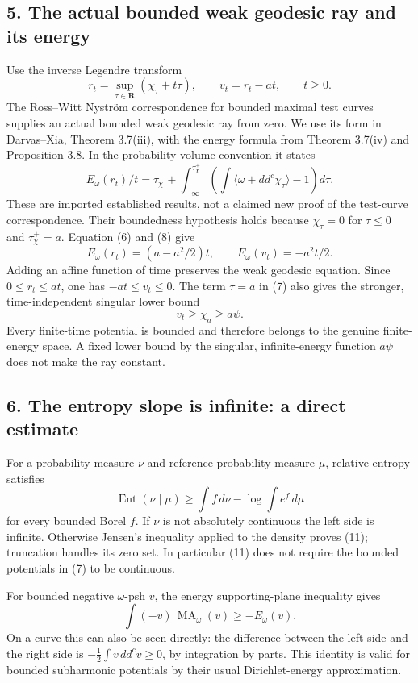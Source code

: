 \documentclass[
]{article}
\begin{document}
\subsection{5. The actual bounded weak geodesic ray and its
energy}\label{the-actual-bounded-weak-geodesic-ray-and-its-energy}

Use the inverse Legendre transform \[
 r_t=\sup_{\tau\in\mathbf R}(\chi_\tau+t\tau),\qquad
 v_t=r_t-at,\qquad t\geq0.
 \tag{7}
\] The Ross--Witt Nyström correspondence for bounded maximal test curves
supplies an actual bounded weak geodesic ray from zero. We use its form
in Darvas--Xia, Theorem 3.7(iii), with the energy formula from Theorem
3.7(iv) and Proposition 3.8. In the probability-volume convention it
states \[
 E_\omega(r_t)/t=\tau^+_\chi+
 \int_{-\infty}^{\tau^+_\chi}
 \left(\int\langle\omega+dd^c\chi_\tau\rangle-1\right)d\tau.
 \tag{8}
\] These are imported established results, not a claimed new proof of
the test-curve correspondence. Their boundedness hypothesis holds
because \(\chi_\tau=0\) for \(\tau\leq0\) and \(\tau^+_\chi=a\).
Equation (6) and (8) give \[
 E_\omega(r_t)=(a-a^2/2)t,\qquad E_\omega(v_t)=-a^2t/2.
 \tag{9}
\] Adding an affine function of time preserves the weak geodesic
equation. Since \(0\leq r_t\leq at\), one has \(-at\leq v_t\leq0\). The
term \(\tau=a\) in (7) also gives the stronger, time-independent
singular lower bound \[
 v_t\geq\chi_a\geq a\psi.
 \tag{10}
\] Every finite-time potential is bounded and therefore belongs to the
genuine finite-energy space. A fixed lower bound by the singular,
infinite-energy function \(a\psi\) does not make the ray constant.

\subsection{6. The entropy slope is infinite: a direct
estimate}\label{the-entropy-slope-is-infinite-a-direct-estimate}

For a probability measure \(\nu\) and reference probability measure
\(\mu\), relative entropy satisfies \[
 \operatorname{Ent}(\nu\mid\mu)\geq\int f\,d\nu-\log\int e^f\,d\mu
 \tag{11}
\] for every bounded Borel \(f\). If \(\nu\) is not absolutely
continuous the left side is infinite. Otherwise Jensen's inequality
applied to the density proves (11); truncation handles its zero set. In
particular (11) does not require the bounded potentials in (7) to be
continuous.

For bounded negative \(\omega\)-psh \(v\), the energy supporting-plane
inequality gives \[
 \int(-v)\,\operatorname{MA}_\omega(v)\geq-E_\omega(v).
 \tag{12}
\] On a curve this can also be seen directly: the difference between the
left side and the right side is \(-\tfrac12\int v\,dd^cv\geq0\), by
integration by parts. This identity is valid for bounded subharmonic
potentials by their usual Dirichlet-energy approximation.
\end{document}
